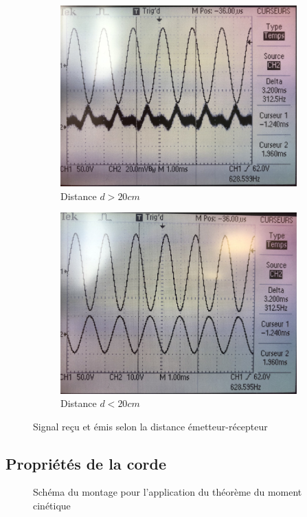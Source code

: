 \documentclass[11pt]{article}
\begin{document}
\begin{figure}[h!]
    \centering
    \begin{subfigure}{.5\textwidth}
      \centering
        \includegraphics[width=.7\linewidth]{img/son_complexe.png}
      \caption{Distance $d>20cm$}
    \end{subfigure}%
    \begin{subfigure}{.5\textwidth}
      \centering
      \includegraphics[width=.7\linewidth]{img/son_simple.png}
      \caption{Distance $d<20cm$}
    \end{subfigure}
    \caption*{Signal reçu et émis selon la distance émetteur-récepteur}
\end{figure}

\subsection{Propriétés de la corde}

\begin{figure}[!h]
    \begin{center}
        \resizebox{0.5\textwidth}{3cm}{
            
        }
    \end{center}
    \caption{Schéma du montage pour l'application du théorème du moment cinétique}
    \label{fig:montage_simple}
\end{figure}
\end{document}
